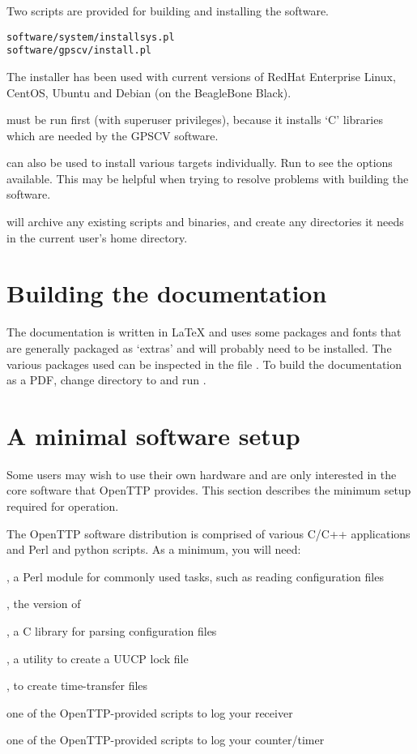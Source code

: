 Two scripts are provided for building and installing the software.
\begin{lstlisting}
software/system/installsys.pl
software/gpscv/install.pl
\end{lstlisting}

The installer has been used with current versions of RedHat Enterprise Linux, 
CentOS, Ubuntu and Debian (on the BeagleBone Black).

 must be run first (with superuser privileges), 
because it installs `C' libraries which are needed by the GPSCV software.

 can also be used to install various targets individually.
Run  to see the options available. 
This may be helpful when trying to resolve problems with building the software.

 will archive any existing scripts and binaries, and create any
directories it needs in the current user's home directory.

\section{Building the documentation}

The documentation is written in LaTeX and uses some packages and fonts that are generally packaged as `extras'
and will probably need to be installed. The various packages used can be inspected in the file
.
To build the documentation as a PDF, change directory to  and run .

\section{A minimal software setup}

Some users may wish to use their own hardware and are only interested in the core software that OpenTTP provides.
This section describes the minimum setup required for operation.

The OpenTTP software distribution is comprised of various C/C++ applications and Perl and python scripts.
As a minimum, you will need:
\begin{description*}
	\item {}, a Perl module for commonly used tasks, such as reading configuration files
	\item {}, the  version of 
	\item {}, a C library for parsing configuration files
	\item {}, a utility to create a UUCP lock file
	\item {}, to create time-transfer files
	\item one of the OpenTTP-provided scripts to log your receiver
	\item one of the OpenTTP-provided scripts to log your counter/timer
\end{description*}

